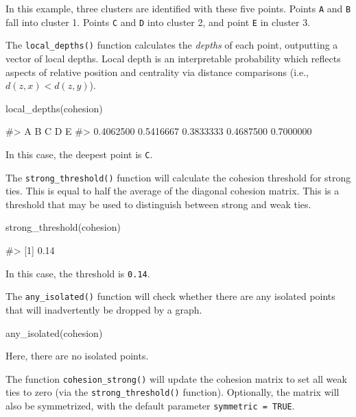 In this example, three clusters are identified with these five points.
Points \texttt{A} and \texttt{B} fall into cluster 1. Points \texttt{C}
and \texttt{D} into cluster 2, and point \texttt{E} in cluster 3.

The \texttt{local\_depths()} function calculates the \emph{depths} of
each point, outputting a vector of local depths. Local depth is an
interpretable probability which reflects aspects of relative position
and centrality via distance comparisons (i.e., \(d(z, x) < d(z, y)\)).

\begin{Schunk}
\begin{Sinput}
local_depths(cohesion)
\end{Sinput}
\begin{Soutput}
#>         A         B         C         D         E 
#> 0.4062500 0.5416667 0.3833333 0.4687500 0.7000000
\end{Soutput}
\end{Schunk}

In this case, the deepest point is \texttt{C}.

The \texttt{strong\_threshold()} function will calculate the cohesion
threshold for strong ties. This is equal to half the average of the
diagonal cohesion matrix. This is a threshold that may be used to
distinguish between strong and weak ties.

\begin{Schunk}
\begin{Sinput}
strong_threshold(cohesion)
\end{Sinput}
\begin{Soutput}
#> [1] 0.14
\end{Soutput}
\end{Schunk}

In this case, the threshold is \texttt{0.14}.

The \texttt{any\_isolated()} function will check whether there are any
isolated points that will inadvertently be dropped by a graph.

\begin{Schunk}
\begin{Sinput}
any_isolated(cohesion)
\end{Sinput}
\end{Schunk}

Here, there are no isolated points.

The function \texttt{cohesion\_strong()} will update the cohesion matrix
to set all weak ties to zero (via the \texttt{strong\_threshold()}
function). Optionally, the matrix will also be symmetrized, with the
default parameter \texttt{symmetric\ =\ TRUE}.

